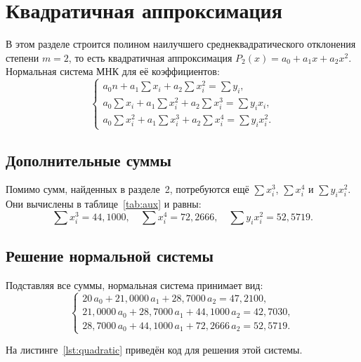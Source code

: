 \section{Квадратичная аппроксимация}

В этом разделе строится полином наилучшего среднеквадратического отклонения
степени $m = 2$, то есть квадратичная аппроксимация
$P_2(x) = a_0 + a_1 x + a_2 x^2$.
Нормальная система МНК для её коэффициентов:
\[
\begin{cases}
a_0 n + a_1 \displaystyle\sum x_i + a_2 \sum x_i^2
    = \sum y_i, \\[6pt]
a_0 \displaystyle\sum x_i + a_1 \sum x_i^2 + a_2 \sum x_i^3
    = \sum y_i x_i, \\[6pt]
a_0 \displaystyle\sum x_i^2 + a_1 \sum x_i^3 + a_2 \sum x_i^4
    = \sum y_i x_i^2.
\end{cases}
\]

\subsection{Дополнительные суммы}

Помимо сумм, найденных в разделе~2, потребуются ещё $\sum x_i^3$, $\sum x_i^4$ и
$\sum y_i x_i^2$. Они вычислены в таблице~\ref{tab:aux} и равны:
\[
\sum x_i^3 = 44{,}1000, \quad \sum x_i^4 = 72{,}2666, \quad
\sum y_i x_i^2 = 52{,}5719.
\]

\subsection{Решение нормальной системы}

Подставляя все суммы, нормальная система принимает вид:
\[
\begin{cases}
20\,a_0 + 21{,}0000\,a_1 + 28{,}7000\,a_2 = 47{,}2100, \\
21{,}0000\,a_0 + 28{,}7000\,a_1 + 44{,}1000\,a_2 = 42{,}7030, \\
28{,}7000\,a_0 + 44{,}1000\,a_1 + 72{,}2666\,a_2 = 52{,}5719.
\end{cases}
\]

На листинге~\ref{lst:quadratic} приведён код для решения этой системы.

